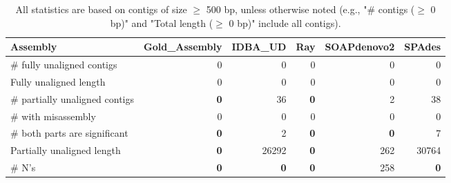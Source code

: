 \documentclass[12pt,a4paper]{article}
\begin{document}
\begin{table}[ht]
\begin{center}
\caption{All statistics are based on contigs of size $\geq$ 500 bp, unless otherwise noted (e.g., "\# contigs ($\geq$ 0 bp)" and "Total length ($\geq$ 0 bp)" include all contigs).}
\begin{tabular}{|l*{5}{|r}|}
\hline
Assembly & Gold\_Assembly & IDBA\_UD & Ray & SOAPdenovo2 & SPAdes \\ \hline
\# fully unaligned contigs & 0 & 0 & 0 & 0 & 0 \\ \hline
Fully unaligned length & 0 & 0 & 0 & 0 & 0 \\ \hline
\# partially unaligned contigs & {\bf 0} & 36 & {\bf 0} & 2 & 38 \\ \hline
\hspace{5mm}\# with misassembly & 0 & 0 & 0 & 0 & 0 \\ \hline
\hspace{5mm}\# both parts are significant & {\bf 0} & 2 & {\bf 0} & {\bf 0} & 7 \\ \hline
Partially unaligned length & {\bf 0} & 26292 & {\bf 0} & 262 & 30764 \\ \hline
\# N's & {\bf 0} & {\bf 0} & {\bf 0} & 258 & {\bf 0} \\ \hline
\end{tabular}
\end{center}
\end{table}
\end{document}
